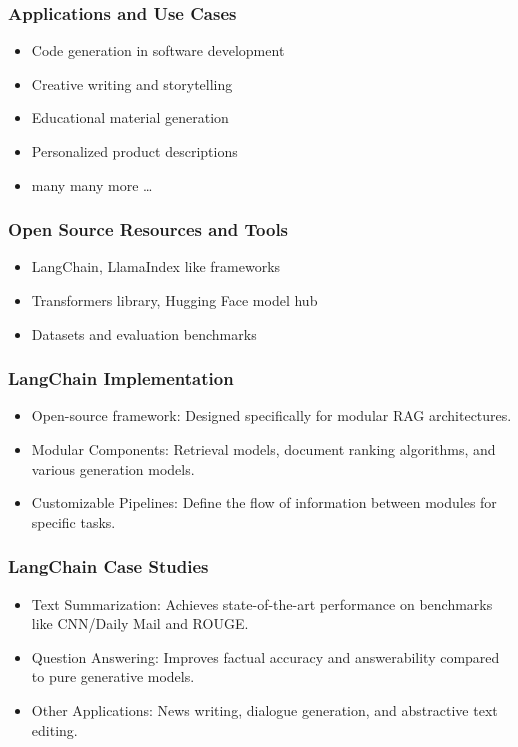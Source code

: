 \begin{frame}[fragile]\frametitle{Applications and Use Cases}

\begin{itemize}
\item Code generation in software development
\item Creative writing and storytelling
\item Educational material generation
\item Personalized product descriptions
\item many many more \ldots
\end{itemize}	

\end{frame}


\begin{frame}[fragile]\frametitle{Open Source Resources and Tools}

\begin{itemize}
\item LangChain, LlamaIndex like frameworks
\item Transformers library, Hugging Face model hub
\item Datasets and evaluation benchmarks
\end{itemize}	

\end{frame}



\begin{frame}[fragile]\frametitle{LangChain Implementation}

\begin{itemize}
\item Open-source framework: Designed specifically for modular RAG architectures.
\item Modular Components: Retrieval models, document ranking algorithms, and various generation models.
\item Customizable Pipelines: Define the flow of information between modules for specific tasks.
\end{itemize}	

\end{frame}

\begin{frame}[fragile]\frametitle{LangChain Case Studies}

\begin{itemize}
\item Text Summarization: Achieves state-of-the-art performance on benchmarks like CNN/Daily Mail and ROUGE.
\item Question Answering: Improves factual accuracy and answerability compared to pure generative models.
\item Other Applications: News writing, dialogue generation, and abstractive text editing.
\end{itemize}	

\end{frame}

